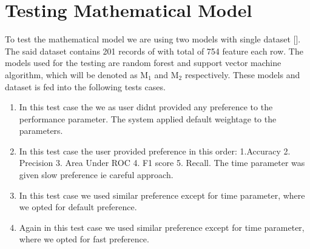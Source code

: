 %

\section{Testing Mathematical Model}\label{sec:testing_mathematical_model}

To test the mathematical model we are using two models with single dataset []. The said dataset contains 201 records of with total of 754 feature each row. The models used for the testing are random forest and support vector machine algorithm, which will be denoted as M$_1$ and M$_2$ respectively. These models and dataset is fed into the following tests cases.

\begin{enumerate}[label=\textbf{CASE \Roman*:},leftmargin=*,align=left]
  \item In this test case the we as user didnt provided any preference to the performance parameter. The system applied default weightage to the parameters.
  \item In this test case the user provided preference in this order: 1.Accuracy 2. Precision 3. Area Under ROC 4. F1 score 5. Recall. The time parameter was given slow preference ie careful approach.
  \item In this test case we used similar preference except for time parameter, where we opted for default preference.
  \item Again in this test case we used similar preference except for time parameter, where we opted for fast preference.
\end{enumerate}

